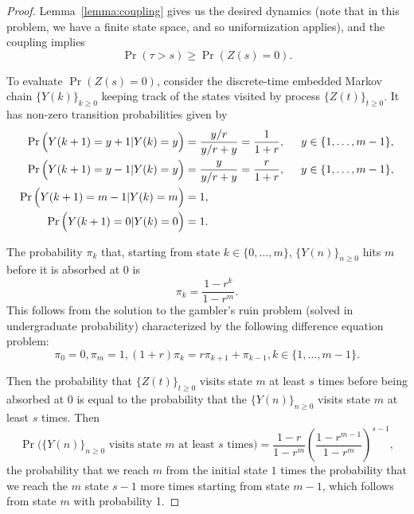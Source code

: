 \documentclass[11pt]{article}
\begin{document}
\begin{proof}
Lemma~\ref{lemma:coupling} gives us the desired dynamics (note that in this problem, we have a finite state space, and so uniformization applies), and the coupling implies
$$\Pr(\tau > s) \geq \Pr(Z(s) = 0).$$

To evaluate $\Pr(Z(s) = 0)$, consider the discrete-time embedded Markov chain $\{Y(k)\}_{k\geq 0}$ keeping track of the states visited by process $\{Z(t)\}_{t\geq 0}$. It has non-zero transition probabilities given by
$$\begin{aligned}
\Pr\Big(Y(k+1)=y+1 | Y(k)=y\Big) &= \frac{y/r}{y/r+y} = \frac{1}{1+r}, \hspace{0.5cm} y\in\{1,\ldots,m-1\}, \\
\Pr\Big(Y(k+1)=y-1 | Y(k)=y\Big) &= \frac{y}{y/r+y} = \frac{r}{1+r}, \hspace{0.5cm} y\in\{1,\ldots,m-1\}, \\
\Pr\Big(Y(k+1)=m-1 | Y(k)=m\Big) &= 1, \\
\Pr\Big(Y(k+1)=0 | Y(k)=0\Big) &= 1.
\end{aligned}$$

The probability $\pi_k$ that, starting from state $k\in\{0,\ldots,m\}$, $\{Y(n)\}_{n\geq 0}$ hits $m$ before it is absorbed at $0$ is
$$\pi_k = \frac{1-r^k}{1-r^m}.$$
This follows from the solution to the gambler's ruin problem (solved in undergraduate probability) characterized by the following difference equation problem:
$$\pi_0=0,\pi_m=1,(1+r)\pi_k=r\pi_{k+1}+\pi_{k-1}, k\in\{1,\ldots,m-1\}.$$

Then the probability that $\{Z(t)\}_{t\geq 0}$ visits state $m$ at least $s$ times before being absorbed at 0 is equal to the probability that the $\{Y(n)\}_{n\geq 0}$ visits state $m$ at least $s$ times. Then
$$\Pr\Big(\{Y(n)\}_{n\geq 0} \text{ visits state } m \text{ at least } s \text{ times}\Big) = \frac{1-r}{1-r^m} \left(\frac{1-r^{m-1}}{1-r^m}\right)^{s-1},$$
the probability that we reach $m$ from the initial state $1$ times the probability that we reach the $m$ state $s-1$ more times starting from state $m-1$, which follows from state $m$ with probability 1.


\end{proof}
\end{document}
